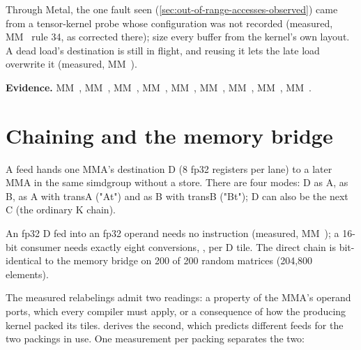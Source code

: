 Through Metal, the one fault seen (\cref{sec:out-of-range-accesses-observed}) came from a  tensor-kernel
probe whose configuration was not recorded (measured, MM~ rule 34, as corrected there); size every buffer from the
kernel's own layout. A dead load's destination is still in flight, and reusing it lets the late load overwrite it
(measured, MM~).

\textbf{Evidence.} MM~, MM~, MM~, MM~, MM~, MM~, MM~, MM~, MM~.

\section{Chaining and the memory bridge}\label{sec:chaining-feed-modes}

A feed hands one MMA's destination D (8 fp32 registers per lane) to a later MMA in the same simdgroup without a
store. There are four modes: D as A, as B, as A with transA ("At") and as B with transB ("Bt"); D can
also be the next C (the ordinary K chain).

An fp32 D fed into an fp32 operand needs no instruction (measured, MM~); a 16-bit consumer needs
exactly eight conversions, , per D tile. The direct chain is bit-identical to the
memory bridge on 200 of 200 random matrices (204,800 elements).

The measured relabelings admit two readings: a property of the MMA's operand ports, which every compiler must apply,
or a consequence of how the producing kernel packed its tiles.  derives the second, which
predicts different feeds for the two packings in use. One measurement per packing separates the two:

